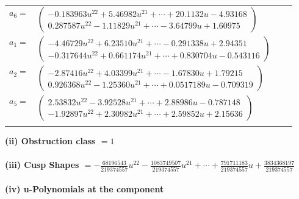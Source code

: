 \documentclass[1p]{elsarticle_modified}
\theoremstyle{definition}
\begin{document}
\begin{tabular}{m{7pt} m{180pt} m{7pt} m{180pt} }
\flushright $a_{6}=$&$\begin{pmatrix}-0.183963 u^{22}+5.46982 u^{21}+\cdots+20.1132 u-4.93168\\0.287587 u^{22}-1.11829 u^{21}+\cdots-3.64799 u+1.60975\end{pmatrix}$ \\
\flushright $a_{1}=$&$\begin{pmatrix}-4.46729 u^{22}+6.23510 u^{21}+\cdots-0.291338 u+2.94351\\-0.317644 u^{22}+0.661174 u^{21}+\cdots+0.830704 u-0.543116\end{pmatrix}$ \\
\flushright $a_{2}=$&$\begin{pmatrix}-2.87416 u^{22}+4.03399 u^{21}+\cdots-1.67830 u+1.79215\\0.926368 u^{22}-1.25360 u^{21}+\cdots+0.0517189 u-0.709319\end{pmatrix}$ \\
\flushright $a_{5}=$&$\begin{pmatrix}2.53832 u^{22}-3.92528 u^{21}+\cdots+2.88986 u-0.787148\\-1.92897 u^{22}+2.30982 u^{21}+\cdots+2.59852 u+2.15636\end{pmatrix}$\\&\end{tabular}
\flushleft \textbf{(ii) Obstruction class $= 1$}\\~\\
\flushleft \textbf{(iii) Cusp Shapes $= -\frac{68196543}{219374557} u^{22}-\frac{1083749507}{219374557} u^{21}+\cdots+\frac{791711183}{219374557} u+\frac{3834368197}{219374557}$}\\~\\
\newpage\renewcommand{\arraystretch}{1}
\flushleft \textbf{(iv) u-Polynomials at the component}\newline \\
\end{document}
